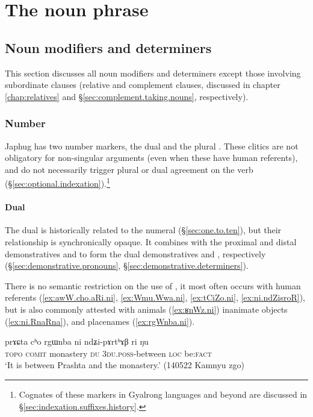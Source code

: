 \chapter{The noun phrase} \label{chap:noun.phrase}


\section{Noun modifiers and determiners} \label{sec:determiners}
This section discusses all noun modifiers and determiners except those involving subordinate clauses (relative and complement clauses, discussed in chapter \ref{chap:relatives} and §\ref{sec:complement.taking.nouns}, respectively). 
 
\subsection{Number}  \label{sec:number.determiners}
Japhug has two number markers, the dual  and the plural . These clitics are not obligatory for non-singular arguments (even when these have human referents), and do not necessarily trigger plural or dual agreement on the verb (§\ref{sec:optional.indexation}).\footnote{Cognates of these markers in Gyalrong languages and beyond are discussed in §\ref{sec:indexation.suffixes.history}. }

\subsubsection{Dual} \label{sec:dual.determiners}
The dual  is historically related to the numeral  (§\ref{sec:one.to.ten}), but their relationship is synchronically opaque. It combines with the proximal and distal demonstratives  and  to form the dual demonstratives  and , respectively (§\ref{sec:demonstrative.pronouns}, §\ref{sec:demonstrative.determiners}).

There is no semantic restriction on the use of , it most often occurs with human referents (\ref{ex:awW.cho.aRi.ni}, \ref{ex:Wmu.Wwa.ni}, \ref{ex:tCiZo.ni}, \ref{ex:ni.ndZisroR}), but is also commonly attested with animals (\ref{ex:ʁnWz.ni}) inanimate objects (\ref{ex:ni.RnaRna}), and placenames (\ref{ex:rgWnba.ni}). 

\begin{exe}
\ex \label{ex:rgWnba.ni}
\gll prɤɕta cʰo rgɯnba ni ndʑi-pɤrtʰɤβ ri ŋu \\
\textsc{topo} \textsc{comit} monastery \textsc{du} \textsc{3du}.\textsc{poss}-between \textsc{loc} be:\textsc{fact} \\
\glt `It is between Prashta and the monastery.' (140522 Kamnyu zgo)
\end{exe}

